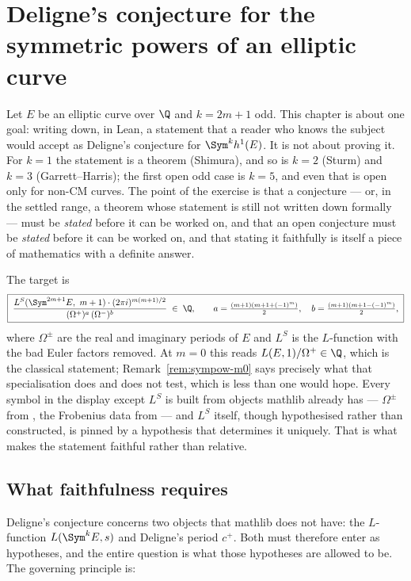 \chapter{Deligne's conjecture for the symmetric powers of an elliptic curve}
\label{chap:sympow}

Let $E$ be an elliptic curve over $\Q$ and $k = 2m+1$ odd. This chapter is about one goal:
writing down, in Lean, a statement that a reader who knows the subject would accept as
Deligne's conjecture for $\Sym^{k}h^{1}(E)$. It is not about proving it. For $k=1$ the
statement is a theorem (Shimura), and so is $k=2$ (Sturm) and $k=3$ (Garrett--Harris); the
first open odd case is $k=5$, and even that is open only for non-CM curves. The point of the
exercise is that a conjecture --- or, in the settled range, a theorem whose statement is still
not written down formally --- must be \emph{stated} before it can be worked on, and that an
open conjecture must be \emph{stated} before it can be worked on, and that stating it
faithfully is itself a piece of mathematics with a definite answer.

The target is
\[
  \boxed{\;
  \frac{L^{S}(\Sym^{2m+1}E,\ m+1)\cdot (2\pi i)^{m(m+1)/2}}
       {(\Omega^{+})^{a}\,(\Omega^{-})^{b}} \;\in\; \Q,
  \qquad
  a = \tfrac{(m+1)(m+1+(-1)^{m})}{2},\quad
  b = \tfrac{(m+1)(m+1-(-1)^{m})}{2},\;}
\]
where $\Omega^{\pm}$ are the real and imaginary periods of $E$ and $L^{S}$ is the $L$-function
with the bad Euler factors removed. At $m=0$ this reads $L(E,1)/\Omega^{+} \in \Q$, which is
the classical statement; Remark~\ref{rem:sympow-m0} says precisely what that specialisation
does and does not test, which is less than one would hope. Every symbol in the display except
$L^{S}$ is built from objects mathlib already has --- $\Omega^{\pm}$ from ,
the Frobenius data from  --- and $L^{S}$ itself,
though hypothesised rather than constructed, is pinned by a hypothesis that determines it
uniquely. That is what makes the statement faithful rather than relative.

\section{What faithfulness requires}
\label{sec:sympow-faithful}

Deligne's conjecture concerns two objects that mathlib does not have: the $L$-function
$L(\Sym^{k}E,s)$ and Deligne's period $c^{+}$. Both must therefore enter as hypotheses, and
the entire question is what those hypotheses are allowed to be. The governing principle is:

